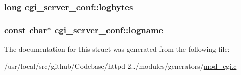 \subsubsection[{\texorpdfstring{logbytes}{logbytes}}]{\setlength{\rightskip}{0pt plus 5cm}long cgi\+\_\+server\+\_\+conf\+::logbytes}\hypertarget{structcgi__server__conf_ab6bb27222e321572e607337b19e138e4}{}\label{structcgi__server__conf_ab6bb27222e321572e607337b19e138e4}
\subsubsection[{\texorpdfstring{logname}{logname}}]{\setlength{\rightskip}{0pt plus 5cm}const char$\ast$ cgi\+\_\+server\+\_\+conf\+::logname}\hypertarget{structcgi__server__conf_aa630eeacabd08141502fe559788c4e86}{}\label{structcgi__server__conf_aa630eeacabd08141502fe559788c4e86}


The documentation for this struct was generated from the following file\+:\begin{DoxyCompactItemize}
\item 
/usr/local/src/github/\+Codebase/httpd-\/2../modules/generators/\hyperlink{mod__cgi_8c}{mod\+\_\+cgi.\+c}\end{DoxyCompactItemize}
